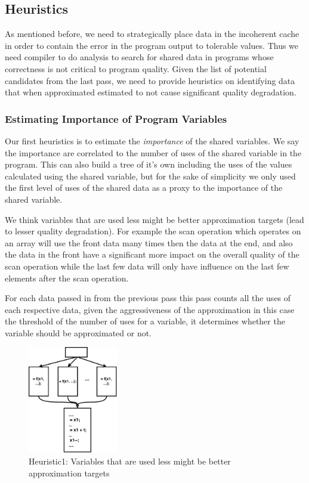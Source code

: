 \documentclass[12pt,conference]{IEEEtran}
\begin{document}
\subsection{Heuristics}

As mentioned before, we need to strategically place data
in the incoherent cache in order to contain the error in the 
program output to tolerable values. Thus we need compiler to do analysis 
to search for shared data in programs whose correctness is not critical to 
program quality. Given the list of potential candidates from the last
pass, we need to provide heuristics on identifying data that when
approximated estimated to not cause significant quality degradation.
\\
\subsubsection{Estimating Importance of Program Variables}

Our first heuristics is to estimate the \emph{importance} of 
the shared variables. We say the importance are correlated to 
the number of uses of the shared variable in the program. This
can also build a tree of it's own including the uses of the values
calculated using the shared variable, but for the sake of simplicity
we only used the first level of uses of the shared data as a proxy 
to the importance of the shared variable.

We think variables that are used less might be better approximation 
targets (lead to lesser quality degradation). For example the scan
operation which operates on an array will use the front data many
times then the data at the end, and also the data in the front
have a significant more impact on the overall quality of the 
scan operation while the last few data will only have influence
on the last few elements after the scan operation.

For each data passed in from the previous pass this pass counts all 
the uses of each respective data, given the aggressiveness of 
the approximation in this case the threshold of the number of 
uses for a variable, it determines whether the variable should 
be approximated or not.

\begin{figure}[h]
    \centering
    \includegraphics[width=0.35\textwidth]{Heuristic1.pdf}
    \caption{Heuristic1: Variables that are used less might be better approximation targets}
    \label{fig:h1}
\end{figure}
\end{document}

